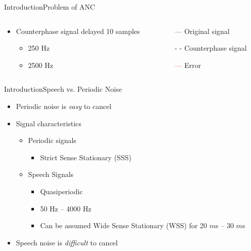 \begin{frame}{Introduction}{Problem of ANC}		
	\begin{columns}
		\begin{column}{0.5\textwidth}
			\begin{itemize}
				\item Counterphase signal delayed 10 samples	
				\begin{itemize}
					\item 250 Hz
					\item 2500 Hz 
				\end{itemize}	
			\end{itemize}
			\vspace{-6.5mm}			
		\begin{center}
	 		
	 	\end{center}
		\end{column}
		\begin{column}{0.5\textwidth} 
		\begin{itemize}
			\item[\textcolor{MATLABblue}{---}] Original signal
			\item[\textcolor{MATLABblue}{- -}] Counterphase signal
			\item[\textcolor{red}{---}] Error
		\end{itemize}
		\begin{center}
	 		
	 	\end{center}
		\end{column}
	\end{columns}
\end{frame}





\begin{frame}{Introduction}{Speech vs. Periodic Noise}		
	\begin{itemize}
		\item Periodic noise is \textit{easy} to cancel
		\item Signal characteristics
		\begin{itemize}
			\item Periodic signals
			\begin{itemize}
				\item Strict Sense Stationary (SSS)
			\end{itemize}
			\item Speech Signals
			\begin{itemize}
				\item Quasiperiodic
				\item 50 Hz -- 4000 Hz
				\item Can be assumed Wide Sense Stationary (WSS) for 20 $m$s -- 30 $m$s 
			\end{itemize}
		\end{itemize}
		\item Speech noise is \textit{difficult} to cancel
	\end{itemize}
\end{frame}




